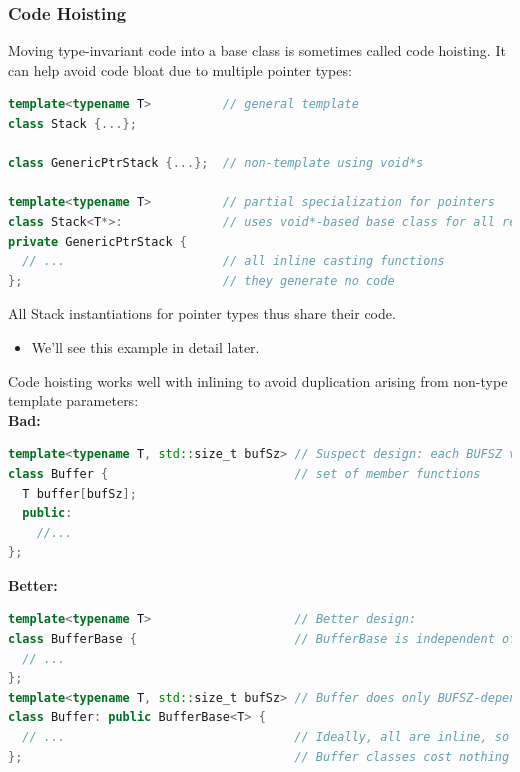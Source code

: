 \subsubsection{Code Hoisting}
Moving type-invariant code into a base class is sometimes called code hoisting. It can help avoid code bloat due to multiple pointer types:
\begin{lstlisting}[language=C++]
template<typename T>          // general template
class Stack {...};

class GenericPtrStack {...};  // non-template using void*s

template<typename T>          // partial specialization for pointers
class Stack<T*>:              // uses void*-based base class for all real work
private GenericPtrStack {
  // ...                      // all inline casting functions
};                            // they generate no code
\end{lstlisting}
All Stack instantiations for pointer types thus share their code.
\begin{itemize}
  \item We'll see this example in detail later.
\end{itemize}

Code hoisting works well with inlining to avoid duplication arising from non-type template parameters:\\
\textbf{Bad:}
\begin{lstlisting}[language=C++]
template<typename T, std::size_t bufSz> // Suspect design: each BUFSZ value will yield a new
class Buffer {                          // set of member functions
  T buffer[bufSz];
  public:
    //...
};
\end{lstlisting}
\textbf{Better:}
\begin{lstlisting}[language=C++]
template<typename T>                    // Better design:
class BufferBase {                      // BufferBase is independent of bufSz
  // ...
};
template<typename T, std::size_t bufSz> // Buffer does only BUFSZ-dependent operations.
class Buffer: public BufferBase<T> {
  // ...                                // Ideally, all are inline, so
};                                      // Buffer classes cost nothing
\end{lstlisting}


